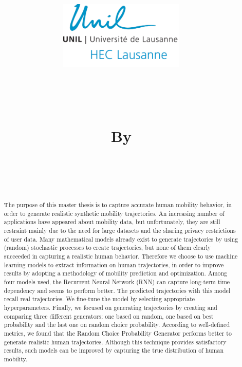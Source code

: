 \documentclass[a4]{article}
\title{
\begin{figure}[H]
    \centering
\includegraphics[width=6cm]{unil.pdf}
\end{figure}
\textmd{\hmwkClass}\\
\vspace{0.5in}
\textmd{\textbf{\hmwkTitle}}\\
\vspace{0.5in}
\textmd{\textbf{By \\ \hmwkAuthorName}}\\
\vspace{0.5in}\large{\textit{\hmwkClassInstructor\ }}
\date{\hmwkFinalDate}
}
\begin{document}
\maketitle
\thispagestyle{empty}
\addtocounter{page}{-1}



\clearpage %
\begingroup
  \null
  \newpage
\endgroup


\newpage
\begin{abstract}
The purpose of this master thesis is to capture accurate human mobility behavior, in order to generate realistic synthetic mobility trajectories. An increasing number of applications have appeared about mobility data, but unfortunately, they are still restraint mainly due to the need for large datasets and the sharing privacy restrictions of user data.
Many mathematical models already exist to generate trajectories by using (random) stochastic processes to create trajectories, but none of them clearly succeeded in capturing a realistic human behavior.
Therefore we choose to use machine learning models to extract information on human trajectories, in order to improve results by adopting a methodology of mobility prediction and optimization.
Among four models used, the Recurrent Neural Network (RNN) can capture long-term time dependency and seems to perform better. The predicted trajectories with this model recall real trajectories.
We fine-tune the model by selecting appropriate hyperparameters.
Finally, we focused on generating trajectories by creating and comparing three different generators; one based on random, one based on best probability and the last one on random choice probability. According to well-defined metrics, we found that the Random Choice Probability Generator performs better to generate realistic human trajectories.
Although this technique provides satisfactory results, such models can be improved by capturing the true distribution of human mobility.
\end{abstract}
\end{document}
